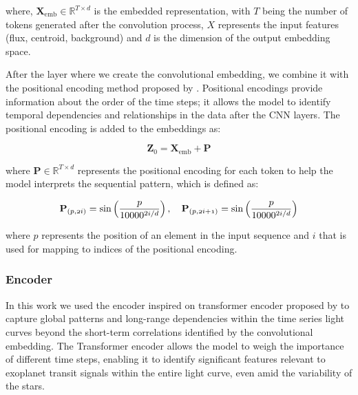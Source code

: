 where, $\mathbf{X}_{\text{emb}} \in \mathbb{R}^{T \times d}$ is the embedded representation, with $T$ being the number of tokens generated after the convolution process, $X$ represents the input features (flux, centroid, background) and $d$ is the dimension of the output embedding space.

After the layer where we create the convolutional embedding, we combine it with the positional encoding method proposed by \cite{vaswani2017attention}. Positional encodings provide information about the order of the time steps; it allows the model to identify temporal dependencies and relationships in the data after the CNN layers. The positional encoding is added to the embeddings as: \par

\begin{equation}
\mathbf{Z}_{0} = \mathbf{X}_{\text{emb}} + \mathbf{P}
\label{eq:z_embedding}
\end{equation}


where $\mathbf{P} \in \mathbb{R}^{T \times d}$ represents the positional encoding for each token to help the model interprets the sequential pattern, which is defined as:

\begin{equation}
\mathbf{P}_{\mathnormal{(p, 2i)}}=\mathrm{sin}\left ( \frac{p}{10000^{2i/d}} \right ),  \quad  \mathbf{P}_{\mathnormal{(p, 2i+1)}}=\mathrm{sin}\left ( \frac{p}{10000^{2i/d}} \right )
\label{equation_pe}
\end{equation}

where $p$ represents the position of an element in the input sequence and $i$ that is used for mapping to indices of the positional encoding.

\subsubsection{Encoder}
\label{sec:encoder}
In this work we used the encoder inspired on transformer encoder proposed by \cite{dosovitskiy2020image} to capture global patterns and long-range dependencies within the time series light curves beyond the short-term correlations identified by the convolutional embedding. The Transformer encoder allows the model to weigh the importance of different time steps, enabling it to identify significant features relevant to exoplanet transit signals within the entire light curve, even amid the variability of the stars. \par 

